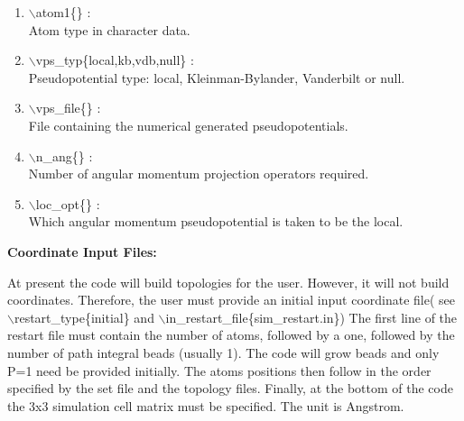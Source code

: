 \begin{itemize}
\begin{enumerate}
 \vspace{0.15in} \Large
 \item  $\backslash$atom1\{\} : \\
    \large
    Atom type in character data.

 \vspace{0.15in} \Large
 \item  $\backslash$vps\_typ\{local,kb,vdb,null\} : \\
    \large
    Pseudopotential type: local, Kleinman-Bylander, Vanderbilt or null.

 \vspace{0.15in} \Large
 \item  $\backslash$vps\_file\{\} : \\
    \large
    File containing the numerical generated pseudopotentials.

 \vspace{0.15in} \Large
 \item  $\backslash$n\_ang\{\} : \\
    \large
    Number of angular momentum projection operators required.

 \vspace{0.15in} \Large
 \item  $\backslash$loc\_opt\{\} : \\
    \large
    Which angular momentum pseudopotential is taken to be the local.

\end{enumerate}

  \end{itemize}

\clearpage
\begin{center}
\huge
{\bf Coordinate Input Files: } 
\end{center}
\large

At present the code will build topologies for the user. However,
it will not build coordinates. Therefore, the user must provide
an initial input coordinate file( see $\backslash$restart\_type\{initial\}
and $\backslash$in\_restart\_file\{sim\_restart.in\})
The first line of the restart file must contain the number of atoms,
followed by a one, followed by the number of path integral beads 
(usually 1). The code will grow beads and only P=1 need be provided
initially. The atoms positions then follow in the order specified by
the set file and the topology files. Finally, at the bottom of
the code the 3x3 simulation cell matrix must be specified.
The unit is Angstrom.

